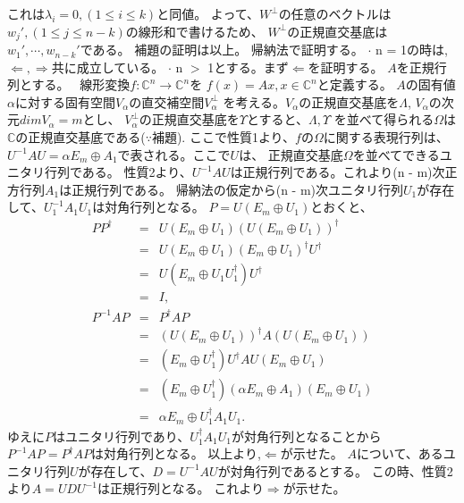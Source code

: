 \begin{itemize}
これは$\lambda_i = 0, (1\leq i\leq k)$と同値。
よって、$W^\perp$の任意のベクトルは$w_j', (1 \leq j\leq n - k)$の線形和で書けるため、
$W^\perp$の正規直交基底は$w_1', \cdots, w_{n - k}'$である。
補題の証明は以上。
\color{red}
\newline
帰納法で証明する。
\newline
$\cdot$ n = 1の時は,$\Leftarrow, \Rightarrow$共に成立している。
\newline
$\cdot$ n $>$ 1とする。まず$\Leftarrow$を証明する。
\newline
$A$を正規行列とする。　
線形変換$f:\mathbb{C}^n \rightarrow \mathbb{C}^n$を
$f(x) = Ax, x \in \mathbb{C}^n$と定義する。
$A$の固有値$\alpha$に対する固有空間$V_{\alpha}$の直交補空間$V_{\alpha}^\perp$
を考える。$V_{\alpha}$の正規直交基底を$\Lambda$, $V_{\alpha}$の次元$dimV_{\alpha} = m$とし、
$V_{\alpha}^\perp$の正規直交基底を$\Upsilon$とすると、$\Lambda, \Upsilon$
を並べて得られる$\Omega$は$\mathbb{C}$の正規直交基底である($\because$補題).
ここで性質1より、$f$の$\Omega$に関する表現行列は、
$U^{-1}AU = \alpha E_m \oplus A_1$で表される。ここで$U$は、
正規直交基底$\Omega$を並べてできるユニタリ行列である。
性質2より、$U^{-1}AU$は正規行列である。これより(n - m)次正方行列$A_1$は正規行列である。
帰納法の仮定から(n - m)次ユニタリ行列$U_1$が存在して、$U_1^{-1}A_1U_1$は対角行列となる。
$P = U(E_m \oplus U_1)$とおくと、
\begin{eqnarray*}
PP^\dagger &=& U(E_m \oplus U_1) (U(E_m \oplus U_1))^\dagger\\
&=& U(E_m \oplus U_1 ) (E_m \oplus U_1)^\dagger U^\dagger\\
&=& U(E_m \oplus U_1 U_1^\dagger) U^\dagger\\
&=& I,\\
P^{-1}AP &=& P^\dagger A P\\
&=& (U(E_m \oplus U_1))^\dagger A (U(E_m \oplus U_1))\\
&=& (E_m \oplus U_1^\dagger) U^\dagger A U (E_m \oplus U_1)\\
&=& (E_m \oplus U_1^\dagger)(\alpha E_m \oplus A_1) (E_m \oplus U_1)\\
&=& \alpha E_m \oplus U_1^\dagger A_1 U_1.
\end{eqnarray*}
ゆえに$P$はユニタリ行列であり、$U_1^\dagger A_1 U_1$が対角行列となることから
$P^{-1}AP = P^\dagger A P$は対角行列となる。
以上より,$\Leftarrow$が示せた。
\newline
$A$について、あるユニタリ行列$U$が存在して、$D = U^{-1}AU$が対角行列であるとする。
この時、性質2より$A = U D U^{-1}$は正規行列となる。 これより$\Rightarrow$が示せた。
\end{itemize}
